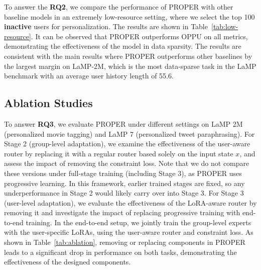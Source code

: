 \documentclass[11pt]{article}
\begin{document}
To answer the \textbf{RQ2}, we compare the performance of PROPER with other baseline models in an extremely low-resource setting, where we select the top 100 \textbf{inactive} users for personalization. 
The results are shown in Table~\ref{tab:low-resource}. It can be observed that PROPER outperforms OPPU on all metrics, demonstrating the effectiveness of the model in data sparsity.
The results are consistent with the main results where PROPER outperforms other baselines by the largest margin on LaMP-2M, which is the most data-sparse task in the LaMP benchmark with an average user history length of 55.6.
\begin{table}[t]
\centering
{}
\caption{Performances comparison between PROPER and OPPU under an extremely low-resource setting on LaMP-3 and LaMP-5. The best results are in \textbf{Bold}.}
\label{tab:low-resource}
\end{table}


\subsection{Ablation Studies}

To answer \textbf{RQ3}, we evaluate PROPER under different settings on LaMP 2M (personalized movie tagging) and LaMP 7 (personalized tweet paraphrasing). 
For Stage 2 (group-level adaptation), we examine the effectiveness of the user-aware router by replacing it with a regular router based solely on the input state $x$, and assess the impact of removing the constraint loss.
Note that we do not compare these versions under full-stage training (including Stage 3), as PROPER uses progressive learning. 
In this framework, earlier trained stages are fixed, so any underperformance in Stage 2 would likely carry over into Stage 3.
For Stage 3 (user-level adaptation), we evaluate the effectiveness of the LoRA-aware router by removing it and investigate the impact of replacing progressive training with end-to-end training. 
In the end-to-end setup, we jointly train the group-level experts with the user-specific LoRAs, using the user-aware router and constraint loss.
As shown in Table~\ref{tab:ablation}, removing or replacing components in PROPER leads to a significant drop in performance on both tasks, demonstrating the effectiveness of the designed components.
\end{document}
